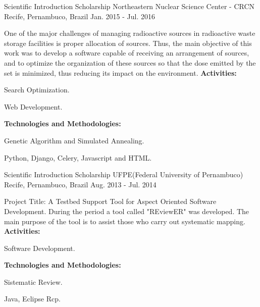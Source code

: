 \begin{cventries}
\cventry
{Scientific Introduction Scholarship} %
{Northeastern Nuclear Science Center - CRCN} %
{Recife, Pernambuco, Brazil} %
{Jan. 2015 - Jul. 2016} %
{ %
One of the major challenges of managing radioactive sources in radioactive waste storage facilities is proper allocation of sources. Thus, the main objective of this work was to develop a software capable of receiving an arrangement of sources, and to optimize the organization of these sources so that the dose emitted by the set is minimized, thus reducing its impact on the environment. \vspace{1.5mm} \hfill \break
\textbf{Activities:} \hfill \break
\begin{cvitems}
\item {Search Optimization.}
\item {Web Development.}
\end{cvitems} \vspace{1.5mm} \hfill \break
\textbf{Technologies and Methodologies:} \hfill \break
\begin{cvitems}
\item {Genetic Algorithm and Simulated Annealing.}
\item {Python, Django, Celery, Javascript and HTML.}
\end{cvitems}
}


\cventry
{Scientific Introduction Scholarship} %
{UFPE(Federal University of Pernambuco)} %
{Recife, Pernambuco, Brazil} %
{Aug. 2013 - Jul. 2014} %
{ %
Project Title: A Testbed Support Tool for Aspect Oriented Software Development. During the period a tool called "REviewER" was developed. The main purpose of the tool is to assist those who carry out systematic mapping. \vspace{1.5mm} \hfill \break
\textbf{Activities:} \hfill \break
\begin{cvitems}
\item {Software Development.}
\end{cvitems} \vspace{1.5mm} \hfill \break
\textbf{Technologies and Methodologies:} \hfill \break
\begin{cvitems}
\item {Sistematic Review.}
\item {Java, Eclipse Rcp.}
\end{cvitems}
}


\end{cventries}